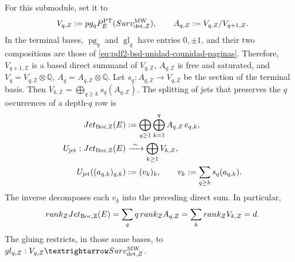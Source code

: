 For this submodule, set it to
\begin{equation}\label{eq:pdf2-bsd-redes-paginas-saturadas}
 V_{q,\mathbb Z}:=\operatorname{pg}_qP_E^{\rm PT}
   (\operatorname{Surv}_{{\rm det},\mathbb Z}^{\rm MW}),
 \qquad
 A_{q,\mathbb Z}:=V_{q,\mathbb Z}/V_{q+1,\mathbb Z}.
\end{equation}
In the terminal bases, $\operatorname{pg}_q$ and
$\operatorname{gl}_q$ have entries $0,\pm1$, and their two compositions are
those of \eqref{eq:pdf2-bsd-unidad-counidad-paginas}. Therefore,
$V_{q+1,\mathbb Z}$ is a based direct summand of $V_{q,\mathbb Z}$,
$A_{q,\mathbb Z}$ is free and saturated, and
$V_q=V_{q,\mathbb Z}\otimes\mathbb Q$,
$A_q=A_{q,\mathbb Z}\otimes\mathbb Q$.
Let $s_q:A_{q,\mathbb Z}\to V_{q,\mathbb Z}$ be the section of the
terminal basis. Then
$V_{k,\mathbb Z}=\bigoplus_{q\geq k}s_q(A_{q,\mathbb Z})$. The splitting
of jets that preserves the $q$ occurrences of a depth-$q$ row is
\begin{equation}\label{eq:pdf2-bsd-desdoblamiento-jets}
 \begin{aligned}
 \operatorname{Jet}_{\rm Boc,\mathbb Z}(E)
   &:=\bigoplus_{q\geq1}\bigoplus_{k=1}^{q}
       A_{q,\mathbb Z}\,e_{q,k},\\
 \mathcal U_{\rm jet}:
 \operatorname{Jet}_{\rm Boc,\mathbb Z}(E)
   &\xrightarrow{\ \sim\ }
     \bigoplus_{k\geq1}V_{k,\mathbb Z},\\
 \mathcal U_{\rm jet}((a_{q,k})_{q,k})
   &:=(v_k)_k,
   \qquad v_k:=\sum_{q\geq k}s_q(a_{q,k}).
 \end{aligned}
\end{equation}
The inverse decomposes each $v_k$ into the preceding direct sum. In particular,
\begin{equation}\label{eq:pdf2-bsd-dimension-jet}
 \operatorname{rank}_{\mathbb Z}\operatorname{Jet}_{\rm Boc,\mathbb Z}(E)
 =\sum_q q\,\operatorname{rank}_{\mathbb Z}A_{q,\mathbb Z}
 =\sum_k\operatorname{rank}_{\mathbb Z}V_{k,\mathbb Z}=d.
\end{equation}
The gluing restricts, in those same bases, to
$\operatorname{gl}_{q,\mathbb Z}:V_{q,\mathbb Z}\to
\operatorname{Surv}_{{\rm det},\mathbb Z}^{\rm MW}$.

